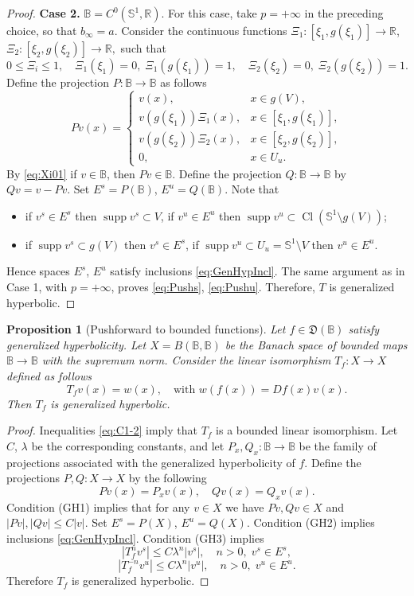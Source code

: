\documentclass[12pt]{article}
\newcommand{\Bb}{\mathbb{B}}
\newcommand{\Rr}{\mathbb{R}}
\newcommand{\DUC}{\mathfrak{D}}
\DeclareMathOperator{\Cl}{Cl}
\DeclareMathOperator{\supp}{supp}
\newtheorem{statement}[thm]{Proposition}
\theoremstyle{definition}
\begin{document}
\begin{proof}
\textbf{Case 2.} $\Bb = C^0(\mathbb{S}^1, \Rr)$.
For this case, take $p=+\infty$ in the preceding choice, so that
$b_\infty=a$. Consider the continuous functions 
$
\Xi_1:[\xi_1, g(\xi_1)] \to \Rr$, $\Xi_2:[\xi_2, g(\xi_2)] \to \Rr, 
$  
such that
\begin{equation}\label{eq:Xi01}
0 \leq \Xi_i \leq 1, \quad \Xi_1(\xi_1) = 0, \; \Xi_1(g(\xi_1)) = 1, \quad  \Xi_2(\xi_2) = 0, \; \Xi_2(g(\xi_2)) = 1.  
\end{equation}
Define the projection $P:\Bb \to \Bb$ as follows
$$
Pv(x) = 
\begin{cases}
v(x), & x \in g(V), \\
v(g(\xi_1))\Xi_1(x), & x \in [\xi_1, g(\xi_1)], \\
v(g(\xi_2))\Xi_2(x), & x \in [\xi_2, g(\xi_2)], \\
0, & x \in U_u.
\end{cases}
$$
By \eqref{eq:Xi01} if $v \in \Bb$, then $Pv \in \Bb$. Define the projection $Q:\Bb \to \Bb$ by $Qv = v - Pv$. Set $E^s = P(\Bb)$, $E^u = Q(\Bb)$. 
Note that 
\begin{itemize}
    \item if $v^s \in E^s$ then $\supp v^s \subset V$, if $v^u \in E^u$ then $\supp v^u \subset \Cl(\mathbb{S}^1 \setminus g(V))$;
    \item if $\supp v^s \subset g(V)$ then $v^s \in E^s$, if $\supp v^u \subset U_u = \mathbb{S}^1 \setminus V$ then $v^u \in E^u$.
\end{itemize}
Hence spaces $E^s$, $E^u$ satisfy inclusions \eqref{eq:GenHypIncl}.
The same argument as in Case 1, with $p=+\infty$, proves \eqref{eq:Pushs}, \eqref{eq:Pushu}. 
Therefore, $T$ is generalized hyperbolic. 
\end{proof}
\begin{statement}[Pushforward to bounded functions]
\label{stat:pushforward-Linfty}
    Let $f \in \DUC(\Bb)$ satisfy generalized hyperbolicity. Let $X = B(\Bb, \Bb)$ be the Banach space of bounded maps $\Bb \to \Bb$ with the supremum norm. Consider the linear isomorphism $T_f: X \to X$ defined as follows
\begin{equation}\label{eq:3-3-Tf}
    T_fv(x) = w(x), \quad \mbox{with $w(f(x)) = Df(x)v(x)$}.    
\end{equation}
    Then $T_f$ is generalized hyperbolic.
\end{statement}
\begin{proof}
Inequalities \eqref{eq:C1-2} imply that $T_f$ is a bounded linear isomorphism. Let $C$, $\lambda$ be the corresponding constants, and let $P_x, Q_x: \Bb \to \Bb$ be the family of projections associated with the generalized hyperbolicity of $f$. Define the projections $P, Q: X \to X$ by the following
$$
Pv(x) = P_xv(x), \quad Qv(x) = Q_xv(x).
$$
Condition (GH1) implies that for any $v \in X$ we have $Pv, Qv \in X$ and $|Pv|, |Qv| \leq C|v|$. Set $E^s = P(X)$, $E^u = Q(X)$. Condition (GH2) implies inclusions \eqref{eq:GenHypIncl}. Condition (GH3) implies
$$
|T_f^nv^s|\leq C \lambda^n |v^s|, \quad n > 0, \; v^s \in E^s,
$$
$$
|T_f^{-n}v^u|\leq C \lambda^n |v^u|, \quad n > 0, \; v^u \in E^u.
$$
Therefore $T_f$ is generalized hyperbolic.
\end{proof}
\end{document}
